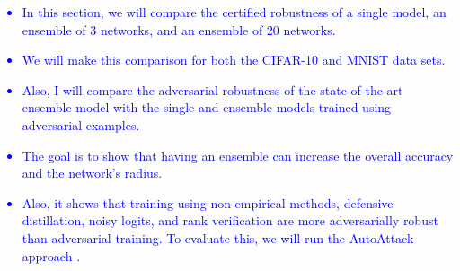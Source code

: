 \documentclass{article}
\begin{document}
\textcolor{blue}{
\begin{itemize}
    \item In this section, we will compare the certified robustness of a single model, an ensemble of 3 networks, and an ensemble of 20 networks.
    \item We will make this comparison for both the CIFAR-10 and MNIST data sets.
    \item Also, I will compare the adversarial robustness of the state-of-the-art ensemble model with the single and ensemble models trained using adversarial examples. 
    \item The goal is to show that having an ensemble can increase the overall accuracy and the network's radius. 
    \item Also, it shows that training using non-empirical methods, defensive distillation, noisy logits, and rank verification are more adversarially robust than adversarial training. To evaluate this, we will run the AutoAttack approach \cite{reference5}.
\end{itemize}
}
\end{document}
